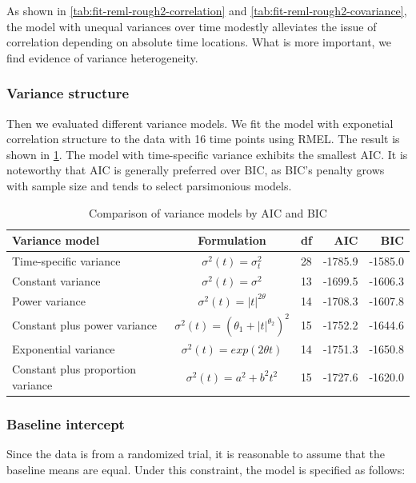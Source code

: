 \documentclass[12pt]{article}
\begin{document}
As shown in \cref{tab:fit-reml-rough2-correlation}
and \cref{tab:fit-reml-rough2-covariance},
the model with unequal variances over time
modestly alleviates the issue of correlation depending
on absolute time locations. What is more important,
we find evidence of variance heterogeneity.

\subsubsection{Variance structure}

Then we evaluated different variance models.
We fit the model with exponetial correlation structure
to the data with 16 time points
using RMEL. The result is shown in \cref{tab:variance-model-compare}.
The model with time-specific variance exhibits the
smallest AIC. It is noteworthy that AIC is generally preferred
over BIC, as BIC's penalty grows with sample size
and tends to select parsimonious models.

\begin{table}[htbp]
  \centering
  \caption{Comparison of variance models by AIC and BIC}
  \label{tab:variance-model-compare}
  \begin{tabular}{lcrrr}
    \hline
    Variance model & Formulation & df & AIC & BIC \\
    \hline
    Time-specific variance & $\sigma^2(t) = \sigma^2_t$ & 28 & -1785.9 & -1585.0 \\
    Constant variance & $\sigma^2(t) = \sigma^2$ & 13 & -1699.5 & -1606.3 \\
    Power variance & $\sigma^2(t) = |t|^{2\theta}$ & 14 & -1708.3 & -1607.8 \\
    Constant plus power variance & $\sigma^2(t) = (\theta_1 + |t|^{\theta_2})^2$ & 15 & -1752.2 & -1644.6 \\
    Exponential variance & $\sigma^2(t) = exp(2\theta t) $ & 14 & -1751.3 & -1650.8 \\
    Constant plus proportion variance & $\sigma^2(t) = a^2 + b^2 t^2$ & 15 & -1727.6 & -1620.0 \\
    \hline
  \end{tabular}
\end{table}

\subsubsection{Baseline intercept}

Since the data is from a randomized trial,
it is reasonable to assume that the baseline means
are equal. Under this constraint, the model is specified
as follows:
\end{document}
